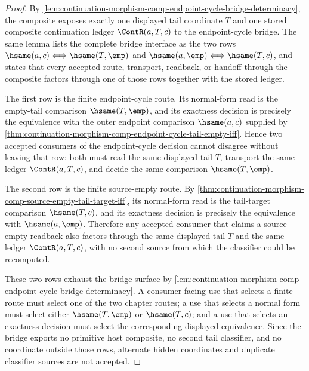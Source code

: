 \begin{proof}
By \autoref{lem:continuation-morphism-comp-endpoint-cycle-bridge-determinacy},
the composite exposes exactly one displayed tail coordinate $T$ and one stored
composite continuation ledger $\ContR(a,T,c)$ to the endpoint-cycle bridge. The
same lemma lists the complete bridge interface as the two rows
$\hsame(a,c)\Longleftrightarrow\hsame(T,\emp)$ and
$\hsame(a,\emp)\Longleftrightarrow\hsame(T,c)$, and states that every accepted
route, transport, readback, or handoff through the composite factors through
one of those rows together with the stored ledger.

The first row is the finite endpoint-cycle route. Its normal-form read is the
empty-tail comparison $\hsame(T,\emp)$, and its exactness decision is precisely
the equivalence with the outer endpoint comparison $\hsame(a,c)$ supplied by
\autoref{thm:continuation-morphism-comp-endpoint-cycle-tail-empty-iff}. Hence
two accepted consumers of the endpoint-cycle decision cannot disagree without
leaving that row: both must read the same displayed tail $T$, transport the
same ledger $\ContR(a,T,c)$, and decide the same comparison
$\hsame(T,\emp)$.

The second row is the finite source-empty route. By
\autoref{thm:continuation-morphism-comp-source-empty-tail-target-iff}, its
normal-form read is the tail-target comparison $\hsame(T,c)$, and its exactness
decision is precisely the equivalence with $\hsame(a,\emp)$. Therefore any
accepted consumer that claims a source-empty readback also factors through the
same displayed tail $T$ and the same ledger $\ContR(a,T,c)$, with no second
source from which the classifier could be recomputed.

These two rows exhaust the bridge surface by
\autoref{lem:continuation-morphism-comp-endpoint-cycle-bridge-determinacy}. A
consumer-facing use that selects a finite route must select one of the two
chapter routes; a use that selects a normal form must select either
$\hsame(T,\emp)$ or $\hsame(T,c)$; and a use that selects an exactness decision
must select the corresponding displayed equivalence. Since the bridge exports
no primitive host composite, no second tail classifier, and no coordinate
outside those rows, alternate hidden coordinates and duplicate classifier
sources are not accepted.
\end{proof}
